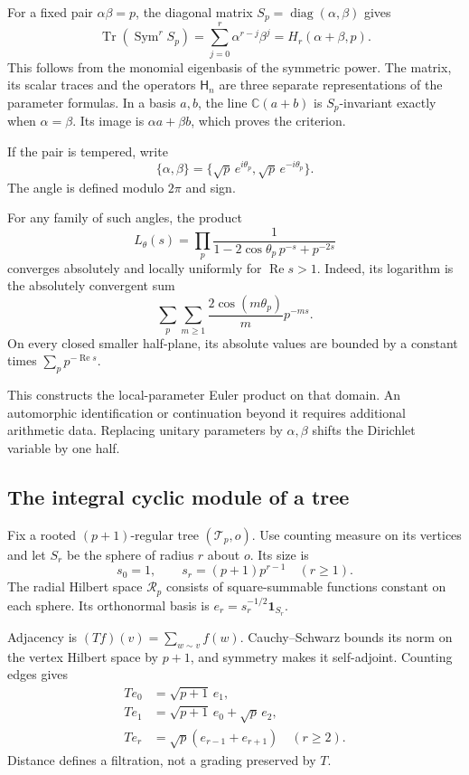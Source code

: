 For a fixed pair $\alpha\beta=p$, the diagonal matrix
$S_p=\operatorname{diag}(\alpha,\beta)$ gives
\[
 \operatorname{Tr}(\operatorname{Sym}^rS_p)
 =\sum_{j=0}^r\alpha^{r-j}\beta^j=H_r(\alpha+\beta,p).
\]
This follows from the monomial eigenbasis of the symmetric power.
The matrix, its scalar traces and the operators $\mathsf H_n$
are three separate representations of the parameter formulas.
In a basis $a,b$, the line $\mathbb C(a+b)$ is $S_p$-invariant
exactly when $\alpha=\beta$. Its image is
$\alpha a+\beta b$, which proves the criterion.

If the pair is tempered, write
\[
 \{\alpha,\beta\}
 =\{\sqrt p\,e^{i\theta_p},\sqrt p\,e^{-i\theta_p}\}.
\]
The angle is defined modulo $2\pi$ and sign.

For any family of such angles, the product
\[
 L_\theta(s)=\prod_p
 \frac1{1-2\cos\theta_p\,p^{-s}+p^{-2s}}
\]
converges absolutely and locally uniformly for $\operatorname{Re}s>1$.
Indeed, its logarithm is the absolutely convergent sum
\[
 \sum_p\sum_{m\geq1}\frac{2\cos(m\theta_p)}m p^{-ms}.
\]
On every closed smaller half-plane, its absolute values are bounded
by a constant times $\sum_pp^{-\operatorname{Re}s}$.

This constructs the local-parameter Euler product on that domain.
An automorphic identification or continuation beyond it requires
additional arithmetic data. Replacing unitary parameters by
$\alpha,\beta$ shifts the Dirichlet variable by one half.

\subsection{The integral cyclic module of a tree}

Fix a rooted $(p+1)$-regular tree $(\mathcal T_p,o)$.
Use counting measure on its vertices and let $S_r$ be the sphere
of radius $r$ about $o$. Its size is
\[
 s_0=1,\qquad s_r=(p+1)p^{r-1}\quad(r\geq1).
\]
The radial Hilbert space $\mathcal R_p$ consists of square-summable
functions constant on each sphere. Its orthonormal basis is
$e_r=s_r^{-1/2}\mathbf1_{S_r}$.

Adjacency is $(Tf)(v)=\sum_{w\sim v}f(w)$.
Cauchy--Schwarz bounds its norm on the vertex Hilbert space by $p+1$,
and symmetry makes it self-adjoint. Counting edges gives
\begin{align*}
 Te_0&=\sqrt{p+1}\,e_1,\\
 Te_1&=\sqrt{p+1}\,e_0+\sqrt p\,e_2,\\
 Te_r&=\sqrt p(e_{r-1}+e_{r+1})\quad(r\geq2).
\end{align*}
Distance defines a filtration, not a grading preserved by $T$.

